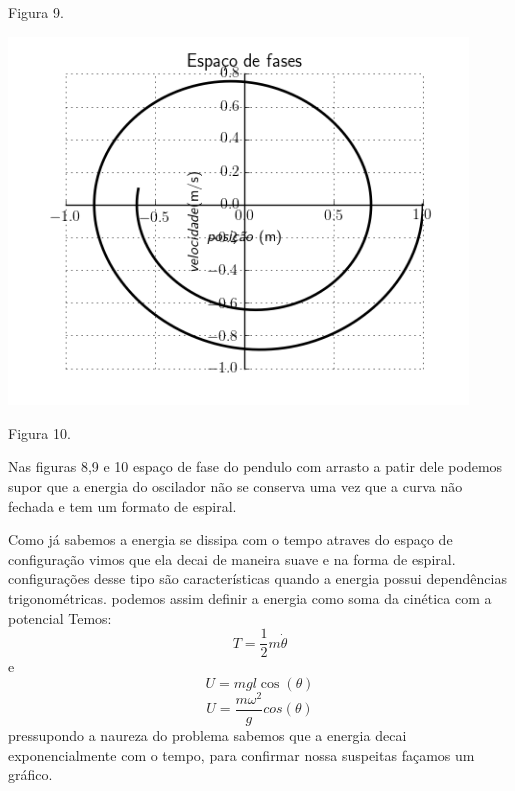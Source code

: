 \documentclass[a4paper]{article} %
\begin{document}
\begin{center}
	\scriptsize  Figura 9. 
	
	\includegraphics[width=4.80in,height=3.84in,keepaspectratio = false]{pendulo3_image3.png}
	
	\scriptsize  Figura 10. 
		
\end{center}

Nas figuras 8,9 e 10 espa\c{c}o de fase do pendulo com arrasto a patir dele podemos supor que a energia do oscilador n\~ao se conserva uma vez que a curva n\~ao fechada e tem um formato de espiral.

Como j\'a sabemos a energia se dissipa com o tempo atraves do espa\c{c}o de configura\c{c}\~ao vimos que ela decai de maneira suave e na forma de espiral. configura\c{c}\~oes desse tipo s\~ao caracter\'isticas quando a energia possui depend\^encias trigonom\'etricas.
podemos assim definir a energia como soma da cin\'etica com a potencial
Temos:
\[T = \frac{1}{2}m\dot{\theta}\]
e
\[U = mgl\cos(\theta)\]
\[U = \frac{m\omega^2}{g}cos(\theta)\]
pressupondo a naureza do problema sabemos que a energia decai exponencialmente com o tempo, para confirmar nossa suspeitas fa\c{c}amos um gr\'afico. 
\end{document}
